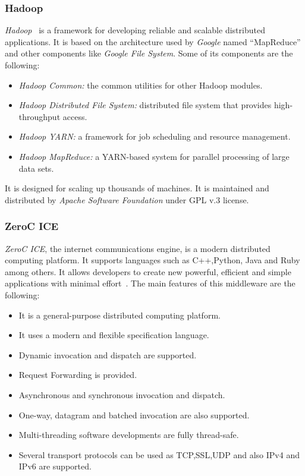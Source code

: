 \subsubsection{Hadoop}
\emph{Hadoop}~\cite{Foundation2008} is a framework for developing  reliable and scalable
distributed applications. It is based on
the architecture used by \emph{Google} named ``MapReduce'' and other components
like \emph{Google File System}.
Some of its components are the following:
\begin{itemize}
\item \emph{Hadoop Common:} the common utilities for other Hadoop modules.
\item \emph{Hadoop Distributed File System:} distributed file system that
  provides high-throughput access.
\item \emph{Hadoop YARN:} a framework for job scheduling and resource management.
\item \emph{Hadoop MapReduce:} a YARN-based system for parallel processing of
  large data sets.
\end{itemize}
It is designed for scaling up thousands of machines. It
is maintained and distributed by \emph{Apache Software Foundation} under \ac{GPL} v.3
license.

\subsubsection{ZeroC ICE}
\emph{ZeroC \ac{ICE}}, the internet communications engine, is a modern distributed computing
platform. It supports languages such as C++,Python, Java and Ruby among others.
It allows developers to create new powerful, efficient and simple applications
with minimal effort~\cite{ZeroC2013}.
The main features of this middleware are the following:

\begin{itemize}
\item It is a general-purpose distributed computing platform.
\item It uses a modern and flexible specification language.
\item Dynamic invocation and dispatch are supported.
\item Request Forwarding is provided.
\item Asynchronous and synchronous invocation and dispatch.
\item One-way, datagram and batched invocation are also supported.
\item Multi-threading software developments are fully thread-safe.
\item Several transport protocols can be used as \ac{TCP},\ac{SSL},\ac{UDP} and also \ac{IP}v4 and
  \ac{IP}v6 are supported.
\end{itemize}

